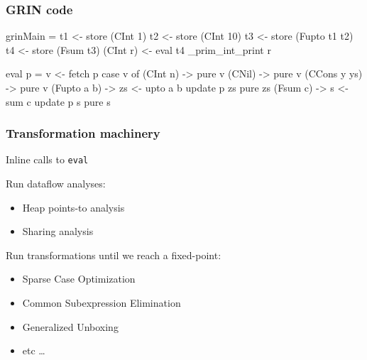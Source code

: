 \documentclass[bigger]{beamer}
\begin{document}
\begin{frame}[fragile]
\frametitle{GRIN code}

\begin{minipage}{0.4\textwidth}

	\begin{haskellcode}
		grinMain =
		  t1 <- store (CInt 1)
		  t2 <- store (CInt 10)
		  t3 <- store (Fupto t1 t2)
		  t4 <- store (Fsum t3)
		  (CInt r) <- eval t4
		  _prim_int_print r
	\end{haskellcode}
\end{minipage}
\hfill
\begin{minipage}{0.48\textwidth}
	\vspace{1cm}
	\begin{haskellcode}
		eval p =
		  v <- fetch p
		  case v of
		    (CInt n)     -> pure v
		    (CNil)       -> pure v
		    (CCons y ys) -> pure v
		    (Fupto a b) ->
		      zs <- upto a b
		      update p zs
		      pure zs
		    (Fsum c) ->
		      s <- sum c
		      update p s
		      pure s
	\end{haskellcode}
\end{minipage}


\end{frame}


\begin{frame}[fragile]
\frametitle{Transformation machinery}

	\begin{vfitemize}

		\item Inline calls to \texttt{eval}
		\item Run dataflow analyses:
			\begin{itemize}
				\item Heap points-to analysis
				\item Sharing analysis
			\end{itemize}
		\item Run transformations until we reach a fixed-point:
			\begin{itemize}
				\item Sparse Case Optimization
				\item Common Subexpression Elimination
				\item Generalized Unboxing
				\item etc \dots
			\end{itemize}

	\end{vfitemize}


\end{frame}
\end{document}
